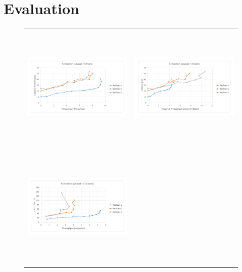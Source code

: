 \documentclass[letterpaper,twocolumn,10pt]{article}
\begin{document}
\section{Evaluation}

\begin{figure}
\begin{tabular}{cc}
\begin{minipage}{0.5\textwidth}
  \includegraphics[width=\textwidth,height=6cm]{results/replication_mops_0.pdf}
\end{minipage}&
\begin{minipage}{0.5\textwidth}
  \includegraphics[width=\textwidth,height=6cm]{results/replication_gbps_0.pdf}
\end{minipage}\\
\begin{minipage}{0.5\textwidth}
  \includegraphics[width=\textwidth,height=6cm]{results/replication_mops_512.pdf}

\end{minipage}
\end{tabular}
\end{figure}
\end{document}
